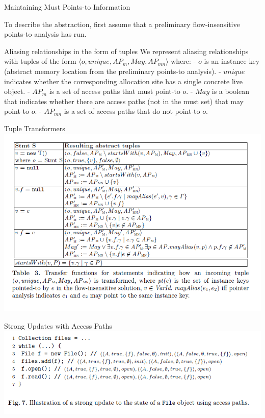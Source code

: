 \documentclass{beamer}
\begin{document}
\begin{frame}{Maintaining Must Points-to Information}
	\begin{block}{}
		To describe the abstraction, first assume that a preliminary 
		flow-insensitive points-to analysis has run.
	\end{block}	
	\pause
	\begin{block}{Aliasing relationships in the form of tuples}
		We represent aliasing relationships with tuples of the form $\langle o, unique, AP_m, May, AP_{mn}
		\rangle$ where:
		\newline
		- $o$ is an instance key (abstract memory location from the preliminary points-to analysis).
		\newline
		- $unique$ indicates whether the corresponding allocation site has a single concrete
		live object.
		\newline
		- $AP_m$ is a set of access paths that must point-to $o$.
		\newline
		- $May$ is a boolean that indicates whether there are access paths (not in the
		must set) that may point to $o$.
		\newline
		- $AP_{mn}$ is a set of access paths that do not point-to $o$.
	\end{block}
\end{frame}

\begin{frame}{Tuple Transformers}
	\includegraphics[width=0.9\paperwidth]{table3.png}
\end{frame}

\begin{frame}{Strong Updates with Access Paths}
	\includegraphics[width=\paperwidth]{fig7.png}
\end{frame}
\end{document}

